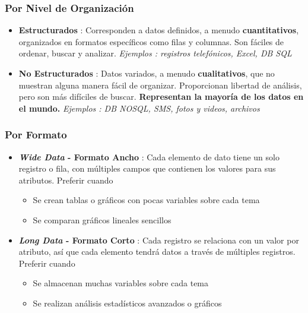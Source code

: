 \subsubsection{Por Nivel de Organización}
\begin{itemize}
    \item {\textbf{Estructurados} : Corresponden a datos definidos, a menudo \textbf{cuantitativos}, organizados en formatos específicos como filas y columnas. Son fáciles de ordenar, buscar y analizar. \textit{Ejemplos : registros telefónicos, Excel, DB SQL}}
    \item {\textbf{No Estructurados} : Datos variados, a menudo \textbf{cualitativos}, que no muestran alguna manera fácil de organizar. Proporcionan libertad de análisis, pero son más difíciles de buscar. \textbf{Representan la mayoría de los datos en el mundo.} \textit{Ejemplos : DB NOSQL, SMS, fotos y videos, archivos}}
\end{itemize}

\subsubsection{Por Formato}
\begin{itemize}
    \item {\textbf{\textit{Wide Data} - Formato Ancho} : Cada elemento de dato tiene un solo registro o fila, con múltiples campos que contienen los valores para sus atributos. Preferir cuando
    \begin{itemize}
        \item {Se crean tablas o gráficos con pocas variables sobre cada tema}
        \item {Se comparan gráficos lineales sencillos}
    \end{itemize}}
    \item {\textbf{\textit{Long Data} - Formato Corto} : Cada registro se relaciona con un valor por atributo, así que cada elemento tendrá datos a través de múltiples registros. Preferir cuando
    \begin{itemize}
        \item {Se almacenan muchas variables sobre cada tema}
        \item {Se realizan análisis estadísticos avanzados o gráficos}
    \end{itemize}}
\end{itemize}

